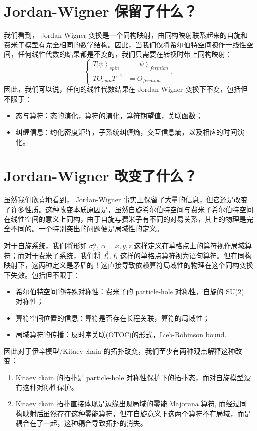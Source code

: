 \documentclass[10pt,UTF8]{ctexart}
\begin{document}
\section*{ Jordan-Wigner 保留了什么？}
\noindent
我们看到， Jordan-Wigner 变换是一个同构映射，由同构映射联系起来的自旋和费米子模型有完全相同的数学结构。因此，当我们仅将希尔伯特空间视作一线性空间，任何线性代数的结果都是不变的，我们只需要在转换时带上同构映射：
\begin{equation}
	\begin{cases} T\left|\psi\right\rangle _{spin} & =\left|\psi\right\rangle _{fermion}\\ TO_{spin}T^{-1} & =O_{fermion} \end{cases}.
\end{equation}
因此，我们可以说，任何的线性代数结果在 Jordan-Wigner 变换下不变，包括但不限于：
\begin{itemize}
	\item 态与算符：态的演化，算符的演化，算符期望值，关联函数；
	\item 纠缠信息：约化密度矩阵，子系统纠缠熵，交互信息熵，以及相应的时间演化。
\end{itemize}

\section*{ Jordan-Wigner 改变了什么？}
\noindent 虽然我们欣喜地看到， Jordan-Wigner 事实上保留了大量的信息，但它还是改变了许多性质。这种改变本质原因是，虽然自旋希尔伯特空间与费米子希尔伯特空间在线性空间的意义上同构，由于自旋与费米子有不同的对易关系，其上的物理是完全不同的。一个特别突出的问题便是局域性的定义。

对于自旋系统，我们将形如  $\sigma_{i}^{\alpha},\ \alpha=x,y,z$ 这样定义在单格点上的算符视作局域算符；而对于费米子系统，我们将 $f_{i}^{\dagger},f_{i}$ 这样的单格点算符视为语句算符。但在同构映射下，这两种定义是矛盾的！这直接导致依赖算符局域性的物理在这个同构变换下失效。包括但不限于：
\begin{itemize}
	\item 希尔伯特空间的特殊对称性：费米子的 particle-hole 对称性，自旋的 SU(2) 对称性；
	\item 算符空间位置的信息：算符是否存在长程关联，算符的局域性；
	\item 局域算符的传播：反时序关联(OTOC)的形式，Lieb-Robinson bound.
\end{itemize}
因此对于伊辛模型/Kitaev chain 的拓扑改变，我们至少有两种观点解释这种改变：
\begin{enumerate}
	\item Kitaev chain 的拓扑是 particle-hole 对称性保护下的拓扑态，而对自旋模型没有这种对称性保护。
	\item Kitaev chain 拓扑直接体现是边缘出现局域的零能 Majorana 算符, 而经过同构映射后虽然存在这种零能算符，但在自旋意义下这两个算符不在局域，而是耦合在了一起，这种耦合导致拓扑的消失。
\end{enumerate}
\end{document}
